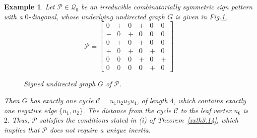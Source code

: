 \documentclass[a4paper, 10pt]{article}
\newtheorem{eg}{Example}[section]
\numberwithin{equation}{section}
\def\sgn{{\rm sgn}}
\def\In{{\rm In}}
\begin{document}
\begin{eg}\label{xxeg12}
	Let $\mathcal{P}\in \mathcal{Q}_6$ be an irreducible combinatorially symmetric sign pattern with a $0$-diagonal, whose underlying undirected graph $G$ is  given in Fig.\ref{xnfig4.1},
	\[
	\mathcal{P} =
	\begin{bmatrix}
		0 & + & 0 & + & 0 & 0 \\
		- & 0 & + & 0 & 0 & 0 \\
		0 & + & 0 & + & 0 & 0 \\
		+ & 0 & + & 0 & + & 0 \\
		0 & 0 & 0 & + & 0 & + \\
		0 & 0 & 0 & 0 & + & 0
	\end{bmatrix}
	\]
	
	\begin{figure}[H]
		\centering
		\tikzset{node distance=1cm}
		\caption{Signed undirected graph $G$ of $\mathcal{P}$.}
		\label{xnfig4.1}
	\end{figure}
	Then $G$ has exactly one cycle $\mathcal{C}=u_1u_2u_3u_4$, of length $4$, which contains exactly one negative edge $\{u_1,u_2\}$. The distance from the cycle $\mathcal{C}$ to the leaf vertex $u_6$ is $2$. Thus, $\mathcal{P}$ satisfies the conditions stated in (i) of Theorem~\ref{xxth3.14}, which implies that $\mathcal{P}$ does not require a unique inertia.
\end{eg}
\end{document}
